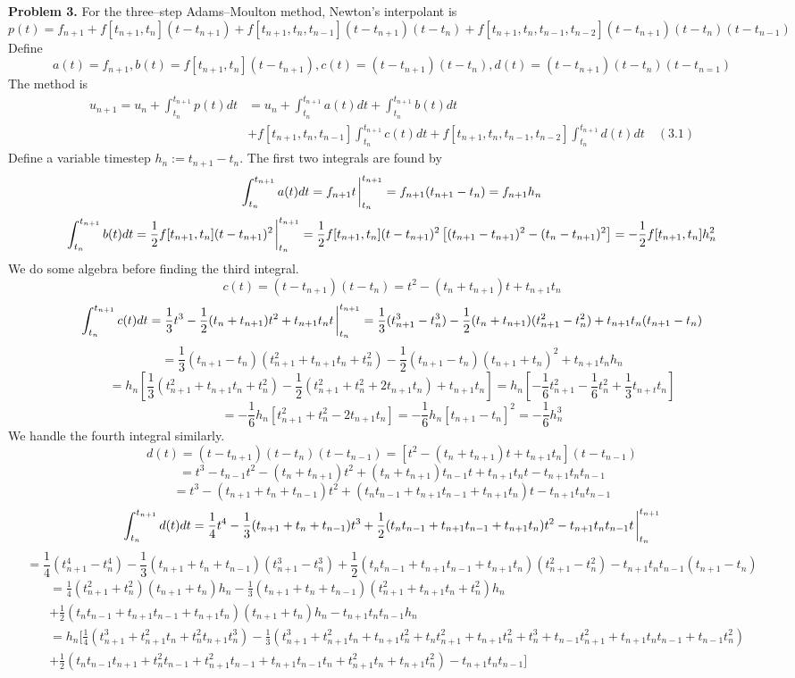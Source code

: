\documentclass{article}
\def\tbf#1{\textbf{#1}}
\newcommand{\sbr}[1]{\left[#1\right]}
\begin{document}
\tbf{Problem 3.} For the three--step Adams--Moulton method, Newton's interpolant is
$$p(t) = f_{n+1} + f[t_{n+1},t_n](t-t_{n+1}) + f[t_{n+1},t_n,t_{n-1}](t-t_{n+1})(t-t_n) + f[t_{n+1},t_n,t_{n-1},t_{n-2}](t-t_{n+1})(t-t_n)(t-t_{n-1})$$
Define
$$a(t) = f_{n+1},
b(t) = f[t_{n+1},t_n](t-t_{n+1}),
c(t) = (t-t_{n+1})(t-t_n),
d(t) = (t-t_{n+1})(t-t_n)(t-t_{n=1})$$
The method is
\begin{align*}
u_{n+1} = u_n + \int_{t_n}^{t_{n+1}}p(t)dt
&= u_n + \int_{t_n}^{t_{n+1}}a(t)dt + \int_{t_n}^{t_{n+1}}b(t)dt\\
&+ f[t_{n+1},t_n,t_{n-1}]\int_{t_n}^{t_{n+1}}c(t)dt + f[t_{n+1},t_n,t_{n-1},t_{n-2}]\int_{t_n}^{t_{n+1}}d(t)dt \quad (3.1)
\end{align*}
Define a variable timestep $h_n:=t_{n+1}-t_n$. The first two integrals are found by
$$\int_{t_n}^{t_{n+1}}a(t)dt = f_{n+1}t\eval_{t_n}^{t_{n+1}}
= f_{n+1}(t_{n+1}-t_n)
= f_{n+1}h_n$$
$$\int_{t_n}^{t_{n+1}}b(t)dt = \frac12f[t_{n+1},t_n](t-t_{n+1})^2\eval_{t_n}^{t_{n+1}}
= \frac12f[t_{n+1},t_n](t-t_{n+1})^2\sbr{(t_{n+1}-t_{n+1})^2-(t_n-t_{n+1})^2}
= -\frac12f[t_{n+1},t_n]h_n^2$$
We do some algebra before finding the third integral.
$$c(t) = (t-t_{n+1})(t-t_n) = t^2 - (t_n+t_{n+1})t + t_{n+1}t_n$$
$$\int_{t_n}^{t_{n+1}}c(t)dt = \frac13t^3 - \frac12(t_n+t_{n+1})t^2 + t_{n+1}t_nt \eval_{t_n}^{t_{n+1}}
= \frac13(t_{n+1}^3-t_n^3) - \frac12(t_n+t_{n+1})(t_{n+1}^2-t_n^2) + t_{n+1}t_n(t_{n+1}-t_n)$$
$$= \frac13(t_{n+1}-t_n)(t_{n+1}^2+t_{n+1}t_n+t_n^2) - \frac12(t_{n+1}-t_n)(t_{n+1}+t_n)^2 + t_{n+1}t_nh_n$$
$$= h_n\sbr{\frac13(t_{n+1}^2+t_{n+1}t_n+t_n^2) - \frac12(t_{n+1}^2+t_n^2+2t_{n+1}t_n) + t_{n+1}t_n}
= h_n\sbr{-\frac16t_{n+1}^2 - \frac16t_n^2 + \frac13t_{n+t}t_n}$$
$$= -\frac16h_n[t_{n+1}^2 + t_n^2 - 2t_{n+1}t_n]
= -\frac16h_n[t_{n+1}-t_n]^2
= -\frac16h_n^3$$
We handle the fourth integral similarly.
$$d(t) = (t-t_{n+1})(t-t_n)(t-t_{n-1})
= [t^2 - (t_n+t_{n+1})t + t_{n+1}t_n](t-t_{n-1})$$
$$= t^3 - t_{n-1}t^2 - (t_n+t_{n+1})t^2 + (t_n+t_{n+1})t_{n-1}t + t_{n+1}t_nt - t_{n+1}t_nt_{n-1}$$
$$= t^3 - (t_{n+1}+t_n+t_{n-1})t^2 + (t_nt_{n-1}+t_{n+1}t_{n-1}+t_{n+1}t_n)t - t_{n+1}t_nt_{n-1}$$
$$\int_{t_n}^{t_{n+1}}d(t)dt = \frac14t^4 - \frac13(t_{n+1}+t_n+t_{n-1})t^3 + \frac12(t_nt_{n-1}+t_{n+1}t_{n-1}+t_{n+1}t_n)t^2 - t_{n+1}t_nt_{n-1}t \eval_{t_n}^{t_{n+1}}$$
$$= \frac14(t_{n+1}^4-t_n^4) - \frac13(t_{n+1}+t_n+t_{n-1})(t_{n+1}^3-t_n^3) + \frac12(t_nt_{n-1}+t_{n+1}t_{n-1}+t_{n+1}t_n)(t_{n+1}^2-t_n^2) - t_{n+1}t_nt_{n-1}(t_{n+1}-t_n)$$
\begin{align*}
&= \frac14(t_{n+1}^2+t_n^2)(t_{n+1}+t_n)h_n - \frac13(t_{n+1}+t_n+t_{n-1})(t_{n+1}^2+t_{n+1}t_n+t_n^2)h_n \\
&+ \frac12(t_nt_{n-1}+t_{n+1}t_{n-1}+t_{n+1}t_n)(t_{n+1}+t_n)h_n - t_{n+1}t_nt_{n-1}h_n \\
&= h_n\Bigg[ \frac14(t_{n+1}^3+t_{n+1}^2t_n+t_n^2t_{n+1}t_n^3) - \frac13(t_{n+1}^3+t_{n+1}^2t_n+t_{n+1}t_n^2+t_nt_{n+1}^2+t_{n+1}t_n^2+t_n^3+t_{n-1}t_{n+1}^2+t_{n+1}t_nt_{n-1}+t_{n-1}t_n^2)\\
&+ \frac12(t_nt_{n-1}t_{n+1}+t_n^2t_{n-1}+t_{n+1}^2t_{n-1}+t_{n+1}t_{n-1}t_n+t_{n+1}^2t_n+t_{n+1}t_n^2) - t_{n+1}t_nt_{n-1} \Bigg]
\end{align*}
\end{document}
